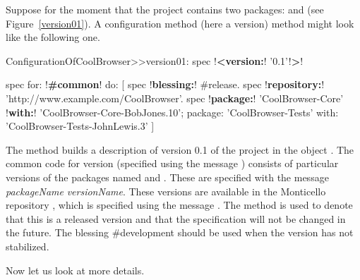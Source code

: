 \documentclass[a4paper,10pt,twoside]{book}
\begin{document}
Suppose for the moment that the project  contains two packages:  and  (see Figure~\ref{version01}). A configuration method (here a version) method might look like the following one.

\begin{code}{}
ConfigurationOfCoolBrowser>>version01: spec 
	!\textbf{<version:}! '0.1'!\textbf{>}!
       
	spec for: !\textbf{\#common}! do: [
    spec !\textbf{blessing:}! #release.
		spec !\textbf{repository:}! 'http://www.example.com/CoolBrowser'.
		spec 
		    !\textbf{package:}! 'CoolBrowser-Core'  !\textbf{with:}! 'CoolBrowser-Core-BobJones.10';
			package: 'CoolBrowser-Tests' with: 'CoolBrowser-Tests-JohnLewis.3' ]
\end{code}

\noindent
The  method  builds a description of version 0.1 of the project in the object .
The common code for version  (specified using the message ) consists of particular versions of the packages named  and .
These are specified with the message  \emph{packageName}  \emph{versionName}.
These versions are available in the Monticello repository , which is specified using the message . The   method is used to denote that this is a released version and that the specification will not be changed in the future. The blessing \#development should be used when the version has not stabilized.

Now let us look at more details.
\end{document}
